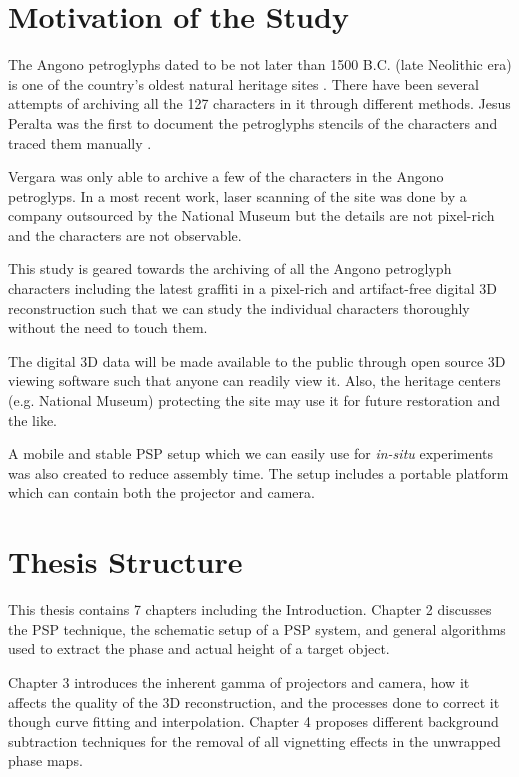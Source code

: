 \section{Motivation of the Study}

The Angono petroglyphs dated to be not later than 1500 B.C. (late Neolithic era) is one of the country's oldest natural heritage sites \cite{Unesco2006}. There have been several attempts of archiving all the 127 characters in it through different methods. Jesus Peralta was the first to document the petroglyphs stencils of the characters and traced them manually \cite{Peralta1973}. 

Vergara was only able to archive a few of the characters in the Angono petroglyps. In a most recent work, laser scanning of the site was done by a company outsourced by the National Museum but the details are not pixel-rich and the characters are not observable.

This study is geared towards the archiving of all the Angono petroglyph characters including the latest graffiti in a pixel-rich and artifact-free digital 3D reconstruction such that we can study the individual characters thoroughly without the need to touch them. 

The digital 3D data will be made available to the public through open source 3D viewing software such that anyone can readily view it. Also, the heritage centers (e.g. National Museum) protecting the site may use it for future restoration and the like.

A mobile and stable PSP setup which we can easily use for \textit{in-situ} experiments was also created to reduce assembly time. The setup includes a portable platform which can contain both the projector and camera.

\section{Thesis Structure}

This thesis contains 7 chapters including the Introduction. Chapter 2 discusses the PSP technique, the schematic setup of a PSP system, and  general algorithms used to extract the phase and actual height of a target object. 

Chapter 3 introduces the inherent gamma of projectors and camera, how it affects the quality of the 3D reconstruction, and the processes done to correct it though curve fitting and interpolation. 
Chapter 4 proposes different background subtraction techniques for the removal of all vignetting effects in the unwrapped phase maps. 

